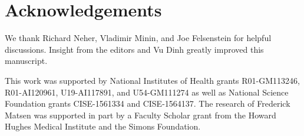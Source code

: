\documentclass[11pt]{article}
\newcommand{\beginsupplement}{%
        \setcounter{table}{0}
        \renewcommand{\thetable}{S\arabic{table}}%
        \setcounter{figure}{0}
        \renewcommand{\thefigure}{S\arabic{figure}}%
     }
\begin{document}
\section*{Acknowledgements}
We thank Richard Neher, Vladimir Minin, and Joe Felsenstein for helpful discussions.
Insight from the editors and Vu Dinh greatly improved this manuscript.

This work was supported by National Institutes of Health grants R01-GM113246, R01-AI120961, U19-AI117891, and U54-GM111274 as well as National Science Foundation grants CISE-1561334 and CISE-1564137.
The research of Frederick Matsen was supported in part by a Faculty Scholar grant from the Howard Hughes Medical Institute and the Simons Foundation.




\newpage
\beginsupplement


\end{document}
